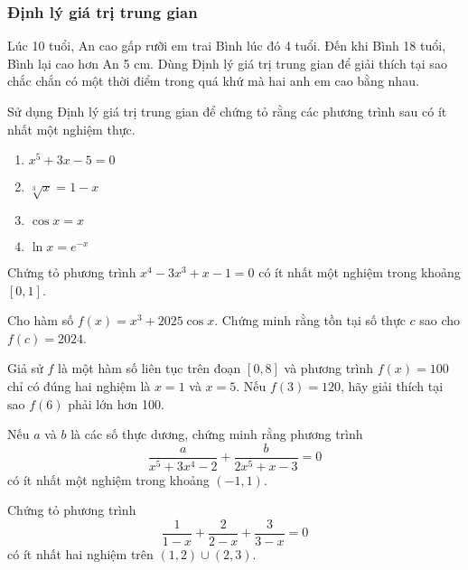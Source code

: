 \subsubsection{Định lý giá trị trung gian}

\begin{exercise}
	Lúc 10 tuổi, An cao gấp rưỡi em trai Bình lúc đó 4 tuổi. Đến khi Bình 18 tuổi, Bình lại cao hơn An 5 cm. Dùng Định lý giá trị trung gian để giải thích tại sao chắc chắn có một thời điểm trong quá khứ mà hai anh em cao bằng nhau.
\end{exercise}

\begin{exercise}
	Sử dụng Định lý giá trị trung gian để chứng tỏ rằng các phương trình sau có ít nhất một nghiệm thực.
	\begin{enumerate}[label=(\alph*)]
		\item \( x^5 + 3x - 5 = 0 \)
		\item \( \sqrt[3]{x} = 1 - x \)
		\item \( \cos x = x \)
		\item \( \ln x = e^{-x} \)
	\end{enumerate}
\end{exercise}

\begin{exercise}
	Chứng tỏ phương trình \( x^4 - 3x^3 + x - 1 = 0 \) có ít nhất một nghiệm trong khoảng \( [0, 1] \).
\end{exercise}

\begin{exercise}
	Cho hàm số \( f(x) = x^3 + 2025 \cos x \). Chứng minh rằng tồn tại số thực \( c \) sao cho \( f(c) = 2024 \).
\end{exercise}

\begin{exercise}
	Giả sử \( f \) là một hàm số liên tục trên đoạn \( [0, 8] \) và phương trình \( f(x) = 100 \) chỉ có đúng hai nghiệm là \( x=1 \) và \( x=5 \). Nếu \( f(3) = 120 \), hãy giải thích tại sao \( f(6) \) phải lớn hơn 100.
\end{exercise}

\begin{exercise}
	Nếu \( a \) và \( b \) là các số thực dương, chứng minh rằng phương trình
	\[
		\dfrac{a}{x^5 + 3x^4 - 2} + \dfrac{b}{2x^5 + x - 3} = 0
	\]
	có ít nhất một nghiệm trong khoảng \( (-1, 1) \).
\end{exercise}

\begin{exercise}
	Chứng tỏ phương trình
	\[
		\dfrac{1}{1-x} + \dfrac{2}{2-x} + \dfrac{3}{3-x} = 0
	\]
	có ít nhất hai nghiệm trên \( (1, 2) \cup (2, 3) \).
\end{exercise}

